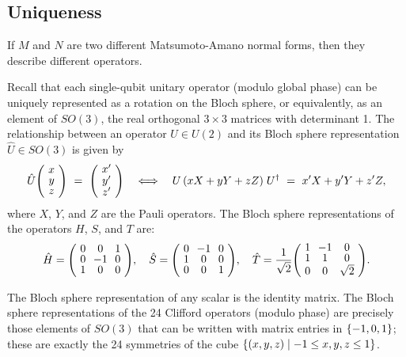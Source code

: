 
\subsection{Uniqueness} %
\label{sub:uniqueness}
\begin{theorem}\label{thm-ma}
  If $M$ and $N$ are two different Matsumoto-Amano normal forms, then they describe different
  operators.
\end{theorem}

Recall that each single-qubit unitary operator (modulo global phase) can be uniquely represented as
a rotation on the Bloch sphere, or equivalently, as an element of $SO(3)$, the real orthogonal
$3\times 3$ matrices with determinant 1. The relationship between an operator $U\in U(2)$ and its
Bloch sphere representation $\hat U\in SO(3)$ is given by
\begin{equation}\label{eqn-bloch-conversion}
  \hat U\zmatrix{c}{x\\y\\z} ~=~ \zmatrix{c}{x'\\y'\\z'}
  \quad\Longleftrightarrow\quad
  U\,(xX+yY+zZ)\;U\da ~=~ x'X + y'Y + z'Z,
\end{equation}
where $X$, $Y$, and $Z$ are the Pauli operators. The Bloch sphere representations of the operators
$H$, $S$, and $T$ are:
\begin{equation}\label{bloch-generators}
  \hat H = \zmatrix{ccc}{0&0&1\\0&-1&0\\1&0&0}, \quad
  \hat S = \zmatrix{ccc}{0&-1&0\\1&0&0\\0&0&1}, \quad
  \hat T = \frac{1}{\sqrt{2}}\zmatrix{ccc}{1&-1&0\\1&1&0\\0&0&\sqrt{2}}.
\end{equation}
\begin{remark}\label{rem-bloch}
  The Bloch sphere representation of any scalar is the identity matrix. The Bloch sphere
  representations of the 24 Clifford operators (modulo phase) are precisely those elements of
  $SO(3)$ that can be written with matrix entries in $\{-1,0,1\}$; these are exactly the 24
  symmetries of the cube $\{(x,y,z)\mid -1\leq x,y,z\leq 1\}$.
\end{remark}

